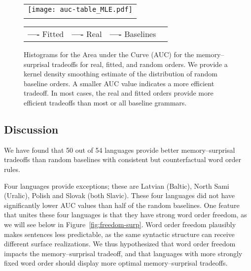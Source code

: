\begin{figure}
	\begin{tabular}{c}
\texttt{[image: auc-table\_MLE.pdf]} \\
		\revision{Area under the Curve (AUC)}
	\end{tabular}

\begin{center}
\begin{tabular}{llll}
\textbf{\textcolor{fitted}{----}} Fitted&
\textbf{\textcolor{real}{----}} Real&
\textbf{\textcolor{baseline}{----}} Baselines&
\end{tabular}
\end{center}
\caption{Histograms for the Area under the Curve (AUC) for the memory--surprisal tradeoffs for real, fitted, and random orders.
We provide a kernel density smoothing estimate of the distribution of random baseline orders.
A smaller AUC value indicates a more efficient tradeoff.
In most cases, the real and fitted orders provide more efficient tradeoffs than most or all baseline grammars.
}\label{fig:auc}
\end{figure}




\subsection{Discussion}\label{subsec:expt2-discussion}

We have found that 50 out of 54 languages provide better memory--surprisal tradeoffs than random baselines with consistent but counterfactual word order rules.




Four languages provide exceptions; these are Latvian (Baltic), North Sami (Uralic), Polish and Slovak (both Slavic). These four languages did not have significantly lower AUC values than half of the random baselines.
One feature that unites these four languages is that they have strong word order freedom, as we will see below in Figure~\ref{fig:freedom-surp}. %
Word order freedom plausibly makes sentences less predictable, as the same syntactic structure can receive different surface realizations.
We thus hypothesized that word order freedom  impacts the memory--surprisal tradeoff, and that languages with more strongly fixed word order should display more optimal memory--surprisal tradeoffs.


